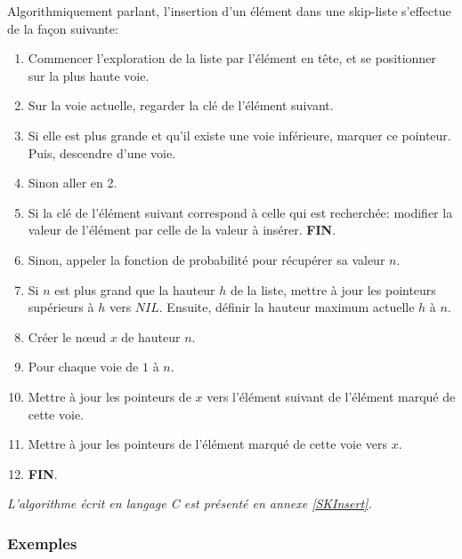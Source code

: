 \documentclass[hidelinks,a4paper, 12pt]{article}
\begin{document}
	Algorithmiquement parlant, l'insertion d'un élément dans une skip-liste s'effectue de la façon suivante:
	\begin{enumerate}
		\item Commencer l'exploration de la liste par l'élément en tête, et se positionner sur la plus haute voie.
		\item Sur la voie actuelle, regarder la clé de l'élément suivant.
		\item Si elle est plus grande et qu'il existe une voie inférieure, marquer ce pointeur. Puis, descendre d'une voie.
		\item Sinon aller en 2.
		\item Si la clé de l'élément suivant correspond à celle qui est recherchée: modifier la valeur de l'élément par celle de la valeur à insérer. \textbf{FIN}.
		\item Sinon, appeler la fonction de probabilité pour récupérer sa valeur $n$.
		\item Si $n$ est plus grand que la hauteur $h$ de la liste, mettre à jour les pointeurs supérieurs à $h$ vers $NIL$. Ensuite, définir la hauteur maximum actuelle $h$ à $n$.
		\item Créer le nœud $x$ de hauteur $n$.
		\item Pour chaque voie de $1$ à $n$.
		\item Mettre à jour les pointeurs de $x$ vers l'élément suivant de l'élément marqué de cette voie.
		\item Mettre à jour les pointeurs de l'élément marqué de cette voie vers $x$.
		\item \textbf{FIN}.
	\end{enumerate}
	\emph{L'algorithme écrit en langage C est présenté en annexe \ref{SKInsert}.}
	
	\newpage
	\subsubsection{Exemples}	
\end{document}
